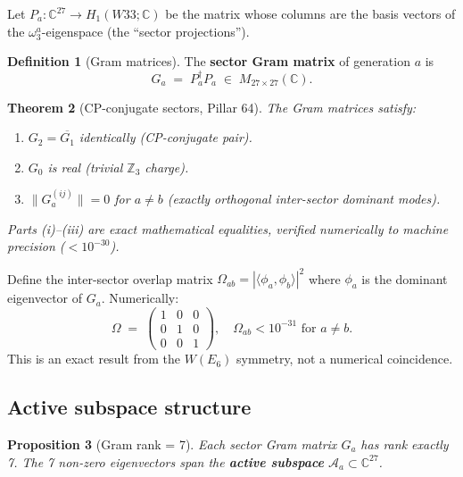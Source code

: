 \documentclass[11pt,a4paper]{article}
\newtheorem{theorem}{Theorem}[section]
\newtheorem{proposition}[theorem]{Proposition}
\theoremstyle{definition}
\newtheorem{definition}[theorem]{Definition}
\theoremstyle{remark}
\newcommand{\ZZ}{\mathbb{Z}}
\newcommand{\CC}{\mathbb{C}}
\begin{document}
Let $P_a : \CC^{27} \to H_1(W33;\CC)$ be the matrix whose columns are the
basis vectors of the $\omega_3^a$-eigenspace (the ``sector projections'').

\begin{definition}[Gram matrices]
The \textbf{sector Gram matrix} of generation $a$ is
\[
    G_a \;=\; P_a^\dagger P_a \;\in\; M_{27\times 27}(\CC).
\]
\end{definition}

\begin{theorem}[CP-conjugate sectors, Pillar 64]\label{thm:cp_conj}
The Gram matrices satisfy:
\begin{enumerate}[label=(\roman*),nosep]
  \item $G_2 = \overline{G_1}$ identically (CP-conjugate pair).
  \item $G_0$ is real (trivial $\ZZ_3$ charge).
  \item $\|G_a^{(ij)}\| = 0$ for $a \neq b$ (exactly orthogonal inter-sector
        dominant modes).
\end{enumerate}
Parts (i)--(iii) are exact mathematical equalities, verified numerically to
machine precision ($< 10^{-30}$).
\end{theorem}

\begin{exactresult}
Define the inter-sector overlap matrix
$\Omega_{ab} = |\langle \phi_a, \phi_b \rangle|^2$
where $\phi_a$ is the dominant eigenvector of $G_a$.
Numerically:
\[
    \Omega \;=\; \begin{pmatrix} 1 & 0 & 0 \\ 0 & 1 & 0 \\ 0 & 0 & 1 \end{pmatrix},
    \quad
    \Omega_{ab} < 10^{-31} \text{ for } a \neq b.
\]
This is an exact result from the $W(E_6)$ symmetry, not a numerical coincidence.
\end{exactresult}

\subsection{Active subspace structure}

\begin{proposition}[Gram rank = 7]\label{prop:gram_rank}
Each sector Gram matrix $G_a$ has rank exactly 7.  The 7 non-zero eigenvectors
span the \textbf{active subspace} $\mathcal{A}_a \subset \CC^{27}$.
\end{proposition}
\end{document}
